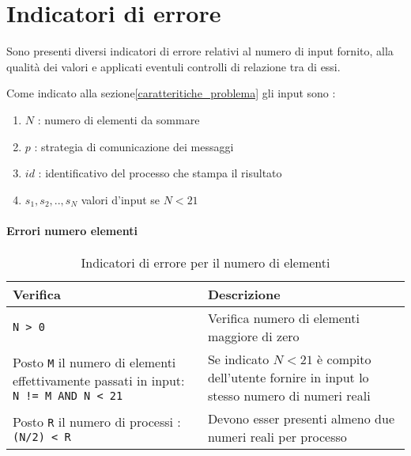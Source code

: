 \documentclass[a4paper,11pt]{book}
\begin{document}
\chapter{Indicatori di errore}
Sono presenti diversi indicatori di errore relativi al numero di input fornito, alla qualità dei valori e applicati eventuli controlli di relazione tra di essi. \par 
Come indicato alla sezione\ref{caratteritiche_problema} gli input sono :
\begin{enumerate}
    \item $N$ : numero di elementi da sommare
    \item $p$ : strategia di comunicazione dei messaggi
    \item $id$ : identificativo del processo che stampa il risultato
    \item $s_1,s_2,..,s_N$ valori d'input se $N < 21$ 
\end{enumerate}

\subsubsection{Errori numero elementi}
\begin{table}[H]
    \begin{tabular}{| p{} | p{} |}
        \hline
        \rowcolor{header}
        \textbf{Verifica} & \textbf{Descrizione} \\
        \hline
        \verb|N > 0| & 
        Verifica numero di elementi maggiore di zero \\
        \hline
        Posto \verb|M| il numero di elementi effettivamente passati in input: \verb|N != M AND N < 21| & 
        Se indicato $N < 21$ è compito dell'utente fornire in input lo stesso numero di numeri reali \\
        \hline
        Posto \verb|R| il numero di processi
        : \verb|(N/2) < R| & 
        Devono esser presenti almeno due numeri reali per processo\\
        \hline
    \end{tabular}
    \caption{Indicatori di errore per il numero di elementi}
    \label{tab:Indicatori di errore per il numero di elementi}
\end{table}
\end{document}
